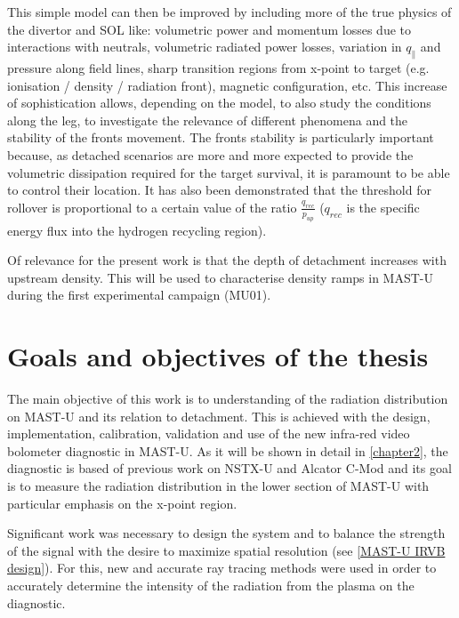 This simple model can then be improved by including more of the true physics of the divertor and SOL like: volumetric power and momentum losses due to interactions with neutrals, volumetric radiated power losses, variation in $q_{\parallel}$ and pressure along field lines, sharp transition regions from x-point to target (e.g. ionisation / density / radiation front), magnetic configuration, etc.\cite{Stangeby2001,Cowley2022,Reinke2017,Lipschultz2016} This increase of sophistication allows, depending on the model, to also study the conditions along the leg, to investigate the relevance of different phenomena and the stability of the fronts movement. The fronts stability is particularly important because, as detached scenarios are more and more expected to provide the volumetric dissipation required for the target survival, it is paramount to be able to control their location. It has also been demonstrated that the threshold for rollover is proportional to a certain value of the ratio $ \frac {q_{rec}} {p_{up}}$ ($q_{rec}$ is the speciﬁc energy ﬂux into the hydrogen recycling region). \cite{Krasheninnikov1999,Krasheninnikov2016,Stangeby2018}

Of relevance for the present work is that the depth of detachment increases with upstream density. This will be used to characterise density ramps in MAST-U during the first experimental campaign (MU01).

\section{Goals and objectives of the thesis}

The main objective of this work is to understanding of the radiation distribution on MAST-U and its relation to detachment. This is achieved with the design, implementation, calibration, validation and use of  the new infra-red video bolometer diagnostic in MAST-U. As it will be shown in detail in \autoref{chapter2}, the diagnostic is based of previous work on NSTX-U\cite{VanEden2016} and Alcator C-Mod\cite{Reinke2018a} and its goal is to measure the radiation distribution in the lower section of MAST-U with particular emphasis on the x-point region.

Significant work was necessary to design the system and to balance the strength of the signal with the desire to maximize spatial resolution (see \autoref{MAST-U IRVB design}). For this, new and accurate ray tracing methods were used in order to accurately determine the intensity of the radiation from the plasma on the diagnostic.

